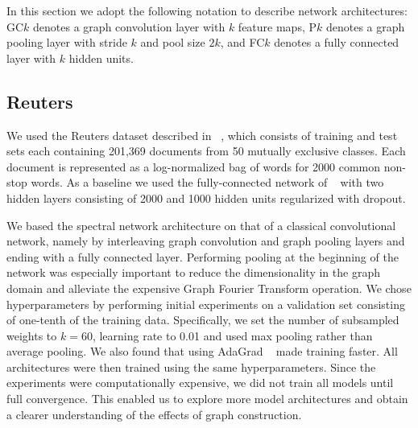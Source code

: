 In this section we adopt the following notation to describe network architectures: GC$k$ denotes a graph convolution layer with $k$ feature maps, P$k$ denotes a graph pooling layer with stride $k$ and pool size $2k$, and FC$k$ denotes a fully connected layer with $k$ hidden units.


\subsection{Reuters}

We used the Reuters dataset described in ~\cite{Hinton2012}, which consists of training and test sets each containing 201,369 documents from 50 mutually exclusive classes. Each document is represented as a log-normalized bag of words for 2000 common non-stop words. As a baseline we used the fully-connected network of ~\cite{Hinton2012} with two hidden layers consisting of 2000 and 1000 hidden units regularized with dropout.  

We based the spectral network architecture on that of a classical convolutional network, namely by interleaving graph convolution and graph pooling layers and ending with a fully connected layer. Performing pooling at the beginning of the network was especially important to reduce the dimensionality in the graph domain and alleviate the expensive Graph Fourier Transform operation.  We chose hyperparameters by performing initial experiments on a validation set consisting of one-tenth of the training data. Specifically, we set the number of subsampled weights to $k=60$, learning rate to 0.01 and used max pooling rather than average pooling. We also found that using AdaGrad ~\cite{adagrad} made training faster. All architectures were then trained using the same hyperparameters.
Since the experiments were computationally expensive, we did not train all models until full convergence. This enabled us to explore more model architectures and obtain a clearer understanding of the effects of graph construction.  

